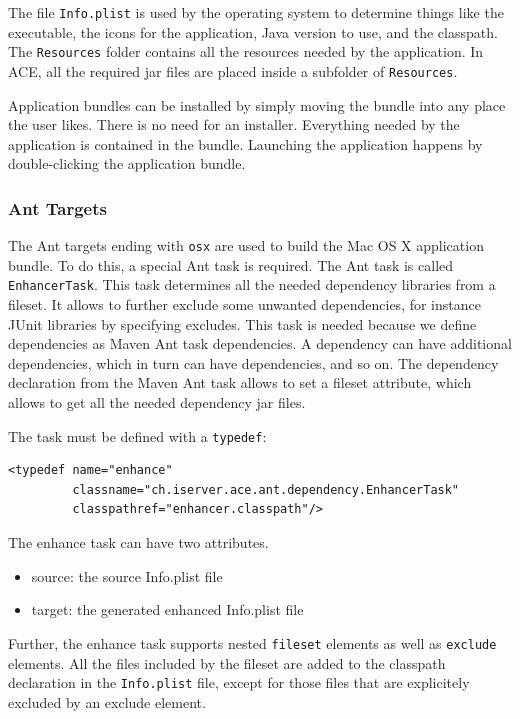 \documentclass[11pt,a4paper]{article}
\begin{document}
The file \texttt{Info.plist} is used by the operating system to determine
things like the executable, the icons for the application, Java version to
use, and the classpath. The \texttt{Resources} folder contains all the
resources needed by the application. In ACE, all the required jar files
are placed inside a subfolder of \texttt{Resources}.

Application bundles can be installed by simply moving the bundle into any
place the user likes. There is no need for an installer. Everything needed
by the application is contained in the bundle. Launching the application
happens by double-clicking the application bundle.

\subsubsection{Ant Targets}
The Ant targets ending with \texttt{osx} are used to build the Mac OS X
application bundle. To do this, a special Ant task is required. The Ant
task is called \texttt{EnhancerTask}. This task determines all the needed
dependency libraries from a fileset. It allows to further exclude some
unwanted dependencies, for instance JUnit libraries by specifying excludes.
This task is needed because we define dependencies as Maven Ant task
dependencies. A dependency can have additional dependencies, which in turn
can have dependencies, and so on. The dependency declaration from 
the Maven Ant task allows to set a fileset attribute, which allows to
get all the needed dependency jar files.

The task must be defined with a \texttt{typedef}:

\small{
\begin{verbatim}
<typedef name="enhance"
         classname="ch.iserver.ace.ant.dependency.EnhancerTask"
         classpathref="enhancer.classpath"/>
\end{verbatim}
}

The enhance task can have two attributes.
\begin{itemize}
 \item source: the source Info.plist file
 \item target: the generated enhanced Info.plist file
\end{itemize}

Further, the enhance task supports nested \texttt{fileset} elements as well
as \texttt{exclude} elements. All the files included by the fileset are
added to the classpath declaration in the \texttt{Info.plist} file, except
for those files that are explicitely excluded by an exclude element.
\end{document}
